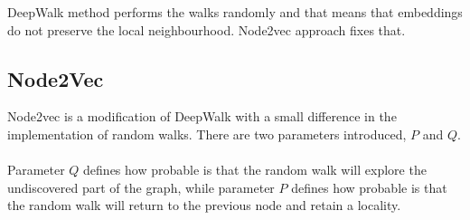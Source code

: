 \noindent  DeepWalk method performs the walks randomly and that means that embeddings do not preserve the local neighbourhood. Node2vec approach fixes that.

\subsection{Node2Vec}

Node2vec is a modification of DeepWalk with a small difference in  the implementation of random walks. There are two parameters introduced, $P$ and $Q$. 
\\
\\
Parameter $Q$ defines how probable is that the random walk will explore the undiscovered part of the graph, while parameter $P$ defines how probable is that the random walk will return to the previous node and retain a locality.

\clearpage


